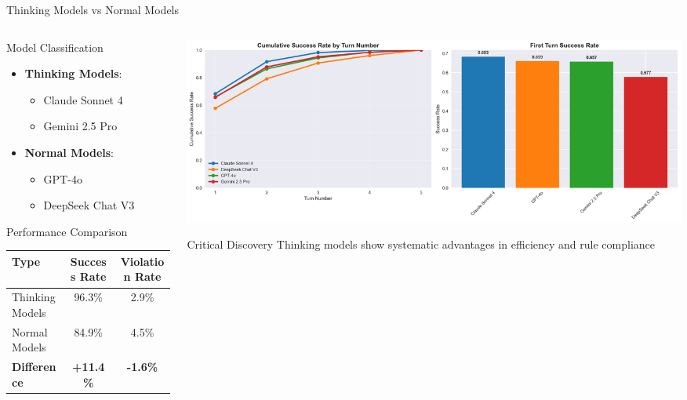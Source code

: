 \documentclass[aspectratio=169]{beamer}
\begin{document}
\begin{frame}{Thinking Models vs Normal Models}
\begin{columns}[c]
\begin{column}{0.5\textwidth}
\begin{block}{Model Classification}
\begin{itemize}
    \item \textbf{Thinking Models}:
    \begin{itemize}
        \item Claude Sonnet 4
        \item Gemini 2.5 Pro
    \end{itemize}
    \item \textbf{Normal Models}:
    \begin{itemize}
        \item GPT-4o
        \item DeepSeek Chat V3
    \end{itemize}
\end{itemize}
\end{block}

\begin{block}{Performance Comparison}
\begin{center}
\begin{tabular}{lcc}
\toprule
\textbf{Type} & \textbf{Success Rate} & \textbf{Violation Rate} \\
\midrule
Thinking Models & 96.3\% & 2.9\% \\
Normal Models & 84.9\% & 4.5\% \\
\midrule
\textbf{Difference} & \textbf{+11.4\%} & \textbf{-1.6\%} \\
\bottomrule
\end{tabular}
\end{center}
\end{block}
\end{column}

\begin{column}{0.48\textwidth}
\begin{center}
\includegraphics[width=\textwidth]{comprehensive_figures/figure2_efficiency.png}
\end{center}

\begin{alertblock}{Critical Discovery}
\small Thinking models show systematic advantages in efficiency and rule compliance
\end{alertblock}
\end{column}
\end{columns}
\end{frame}
\end{document}
